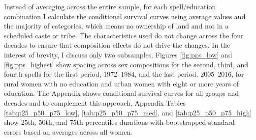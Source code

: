 \documentclass[12pt,letterpaper]{article}
\begin{document}
Instead of averaging across the entire sample, for each spell/education combination I 
calculate the conditional survival curves using average values and the majority of
categories, which means no ownership of land and not in a scheduled caste or tribe.
The characteristics used do not change across the four decades to ensure that composition 
effects do not drive the changes.
In the interest of brevity, I discuss only two subsamples.
Figures \ref{fig:pps_low} and \ref{fig:pps_highest} show spacing across sex compositions for 
the second, third, and fourth spells for the first period, 1972--1984, and the last 
period, 2005--2016, for rural women with no education and urban women with eight or 
more years of education.
The Appendix shows conditional survival curves for all groups and decades and to 
complement this approach, Appendix Tables \ref{tab:p25_p50_p75_low}, 
\ref{tab:p25_p50_p75_med}, and \ref{tab:p25_p50_p75_high} show 25th, 50th, and 75th 
percentiles durations with bootstrapped standard errors based on averages across all women.



\end{document}
